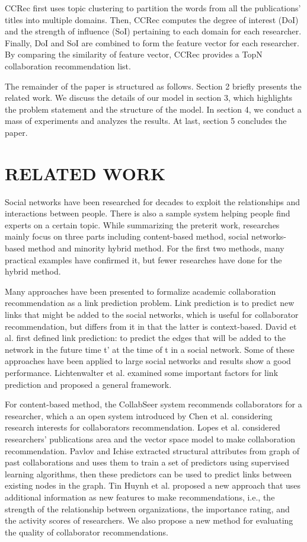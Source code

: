 \documentclass{acm_proc_article-sp}
\begin{document}
CCRec first uses topic clustering to partition the words from all the publications' titles into multiple domains. Then, CCRec computes the degree of interest (DoI) and the strength of influence (SoI) pertaining to each domain for each researcher. Finally, DoI and SoI are combined to form the feature vector for each researcher. By comparing the similarity of feature vector, CCRec provides a TopN collaboration recommendation list.

The remainder of the paper is structured as follows. Section 2 briefly presents the related work. We discuss the details of our model in section 3, which highlights the problem statement and the structure of the model. In section 4, we conduct a mass of experiments and analyzes the results. At last, section 5 concludes the paper.

\section{RELATED WORK}
Social networks have been researched for decades to exploit the relationships and interactions between people. There is also a sample system helping people find experts on a certain topic. While summarizing the preterit work, researches mainly focus on three parts including content-based method, social networks-based method and minority hybrid method. For the first two methods, many practical examples have confirmed it, but fewer researches have done for the hybrid method.

Many approaches have been presented to formalize academic collaboration recommendation as a link prediction problem. Link prediction is to predict new links that might be added to the social networks, which is useful for collaborator recommendation, but differs from it in that the latter is context-based. David et al. first defined link prediction: to predict the edges that will be added to the network in the future time t' at the time of t in a social network. Some of these approaches have been applied to large social networks and results show a good performance. Lichtenwalter et al. examined some important factors for link prediction and proposed a general framework.

For content-based method, the CollabSeer system recommends collaborators for a researcher, which a an open system introduced by Chen et al. considering research interests for collaborators recommendation. Lopes et al. considered researchers' publications area and the vector space model to make collaboration recommendation. Pavlov and Ichise extracted structural attributes from graph of past collaborations and uses them to train a set of predictors using supervised learning algorithms, then these predictors can be used to predict links between existing nodes in the graph. Tin Huynh et al. proposed a new approach that uses additional information as new features to make recommendations, i.e., the strength of the relationship between organizations, the importance rating, and the activity scores of researchers. We also propose a new method for evaluating the quality of collaborator recommendations.
\end{document}
